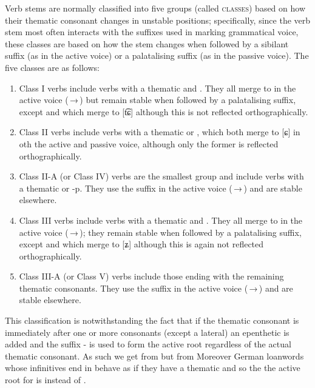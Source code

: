 Verb stems are normally classified into five groups (called {\scshape classes})
based on how their thematic consonant changes in unstable positions;
specifically, since the verb stem most often interacts with the suffixes used in
marking grammatical voice, these classes are based on how the stem changes when
followed by a sibilant suffix (as in the active voice) or a palatalising suffix
(as in the passive voice). The five classes are as follows: 
\begin{enumerate}[nosep]
	\item Class I verbs include verbs with a thematic  and
	. They all merge to  in the active voice
	(\,→\,) but remain stable when followed by a
	palatalising suffix, except  and  which merge to [t͡ɕ]
	although this is not reflected orthographically.
	\item Class II verbs include verbs with a thematic  or ,
	which both merge to [ɕ] in oth the active and passive voice, although only
	the former is reflected orthographically. 
	\item Class II-A (or Class IV) verbs are the smallest group and include
	verbs with a thematic  or {-p}. They use the suffix  in the
	active voice (\,→\,) and are stable elsewhere.
	\item Class III verbs include verbs with a thematic 
	and . They all merge to  in the active voice
	(\,→\,); they remain stable when followed by a
	palatalising suffix, except  and  which merge to [ʑ]
	although this is again not reflected orthographically.
	\item Class III-A (or Class V) verbs include those ending with the remaining
	thematic consonants. They use the suffix  in the active voice
	(\,→\,) and are stable elsewhere.
\end{enumerate}

This classification is notwithstanding the fact that if the thematic consonant
is immediately after one or more consonants (except a lateral) an epenthetic
 is added and the suffix - is used to form the active root
regardless of the actual thematic consonant. As such we get 
from  but  from  Moreover German loanwords whose infinitives end in  behave
as if they have a thematic  and so the the active root for
 is 
instead of .

